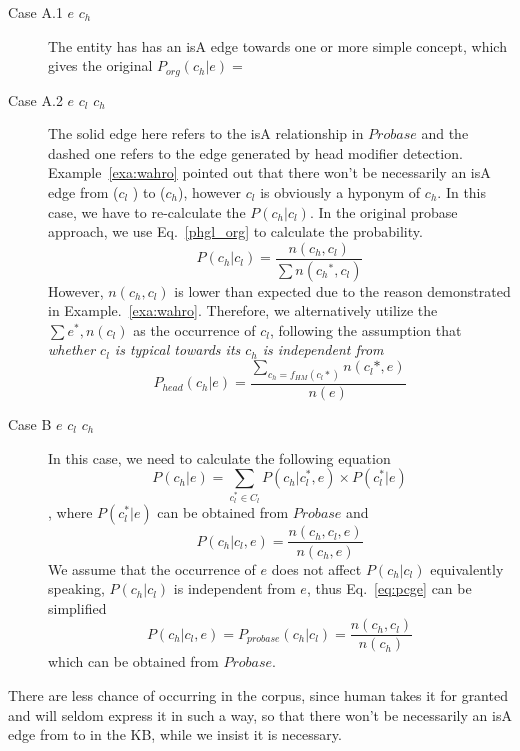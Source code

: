 \begin{description}

\item[Case A.1 $e$ \isa ${c_h}$ ]
 The entity has has an isA edge towards one or more simple concept, which gives the original $P_{org}({c_h}|e)=$


\item[Case A.2 $e$ \isa $c_{l}$ \noisa ${c_h}$]  The solid edge here refers to the isA relationship in $Probase$ and the dashed one refers to the edge generated by head modifier detection. Example~\ref{exa:wahro} pointed out that there won't be necessarily an isA edge from ($c_{l}$ ) to (${c_h}$), however $c_{l}$ is obviously a hyponym of ${c_h}$. In this case,
    we have to re-calculate the $P({c_h}|{c_l})$.
    In the original probase approach, we use Eq.~\ref{phgl_org} to calculate the probability.
    \begin{equation}\label{phgl_org} P({c_h}|{c_l}) = \frac{n( {c_h},{c_l} )}{ \sum{n( {c_h}^*,{c_l} )}  } \end{equation}
    However, $n( {c_h},{c_l} )$ is lower than expected due to the reason demonstrated in Example.~\ref{exa:wahro}.
    Therefore, we alternatively utilize the $\sum{ e^*,n({c_l}) } $ as the occurrence of $c_l$, following the assumption that \em{ whether $c_l$ is typical towards its $c_h$ is independent from }
    $$P_{head}(c_h|e)=\frac{\sum_{c_h= f_{HM}(c_l*)} n(c_l*,e)}{ n(e)} $$

\item[Case B $e$ \isa $c_{l}$  \isa ${c_h}$]  In this case, we need to calculate the following equation
$$P({c_h}|e) = \sum_{c_{l}^*\in C_{l}}   P({c_h}|c_{l}^*,e)   \times    P(c_{l}^*|e) $$
, where $P(c_{l}^*|e)$ can be obtained from $Probase$ and
\begin{equation}P({c_h}|c_{l},e) = \frac{n({c_h},c_{l}, e)}{n({c_h}, e)}\label{eq:pcge}\end{equation}
We assume that the occurrence of $e$ does not affect $P({c_h}|c_{l})$ equivalently speaking, $P({c_h}|c_{l})$ is independent from $e$, thus Eq.~\ref{eq:pcge} can be simplified
$$P({c_h}|c_{l},e) =P_{probase}({c_h}|c_{l}) = \frac{n({c_h},c_{l})}{n({c_h})}$$
which can be obtained from $Probase$.

\end{description}

\begin{example}\label{exa:wahro}
There are less chance of occurring  in the corpus, since human takes it for granted and will seldom express it in such a way, so that there won't be necessarily an isA edge from  to  in the KB, while we insist it is necessary.
\end{example}

